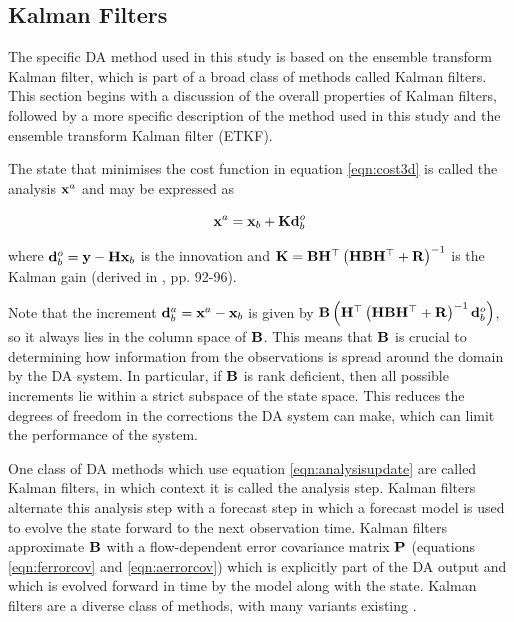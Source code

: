 \subsection{Kalman Filters}
\label{sec:kalmanfilters}

The specific DA method used in this study is based on the ensemble transform Kalman filter, which is part of a broad class of methods called Kalman filters. This section begins with a discussion of the overall properties of Kalman filters, followed by a more specific description of the method used in this study and the ensemble transform Kalman filter (ETKF).

The state that minimises the cost function in equation \ref{eqn:cost3d} is called the analysis $\mathbf{x}^a$ and may be expressed as

\begin{equation}
    \mathbf{x}^a = \mathbf{x}_b + \mathbf{K}\mathbf{d}^o_b
\label{eqn:analysisupdate}
\end{equation}

where $\mathbf{d}^o_b = \mathbf{y} - \mathbf{H}\mathbf{x}_b$ is the innovation and $\mathbf{K} = \mathbf{B}\mathbf{H}^\top\left(\mathbf{H}\mathbf{B}\mathbf{H}^\top + \mathbf{R}\right)^{-1}$ is the Kalman gain (derived in \citet{Asch2016}, pp. 92-96).

Note that the increment $\mathbf{d}^a_b = \mathbf{x}^a - \mathbf{x}_b$ is given by $ \mathbf{B}\left(\mathbf{H}^\top\left(\mathbf{H}\mathbf{B}\mathbf{H}^\top + \mathbf{R}\right)^{-1} \mathbf{d}^o_b \right)$, so it always lies in the column space of $\mathbf{B}$. This means that $\mathbf{B}$ is crucial to determining how information from the observations is spread around the domain by the DA system. In particular, if $\mathbf{B}$ is rank deficient, then all possible increments lie within a strict subspace of the state space. This reduces the degrees of freedom in the corrections the DA system can make, which can limit the performance of the system.

One class of DA methods which use equation \ref{eqn:analysisupdate} are called Kalman filters, in which context it is called the analysis step. Kalman filters alternate this analysis step with a forecast step in which a forecast model is used to evolve the state forward to the next observation time. Kalman filters approximate $\mathbf{B}$ with a flow-dependent error covariance matrix $\mathbf{P}$ (equations \ref{eqn:ferrorcov} and \ref{eqn:aerrorcov}) which is explicitly part of the DA output and which is evolved forward in time by the model along with the state. Kalman filters are a diverse class of methods, with many variants existing \citep{Evensen1992,Bishop2000,Hunt2007,Houtekamer2016}.

